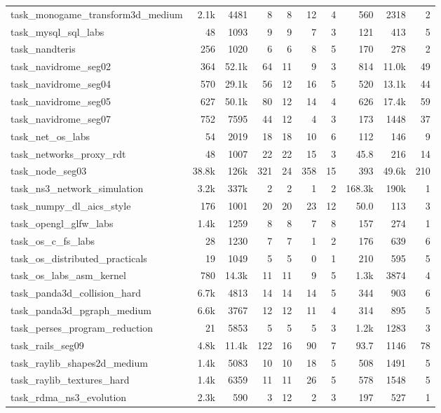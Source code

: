 \begin{table}[!htbp]
{\begin{tabular}{@{}lrr|r|rrr|rrr@{}}
task\_monogame\_transform3d\_medium & 2.1k & 4481 & 8 & 8 & 12 & 4 & 560 & 2318 & 2 \\
task\_mysql\_sql\_labs & 48 & 1093 & 9 & 9 & 7 & 3 & 121 & 413 & 5 \\
task\_nandteris & 256 & 1020 & 6 & 6 & 8 & 5 & 170 & 278 & 2 \\
task\_navidrome\_seg02 & 364 & 52.1k & 64 & 11 & 9 & 3 & 814 & 11.0k & 49 \\
task\_navidrome\_seg04 & 570 & 29.1k & 56 & 12 & 16 & 5 & 520 & 13.1k & 44 \\
task\_navidrome\_seg05 & 627 & 50.1k & 80 & 12 & 14 & 4 & 626 & 17.4k & 59 \\
task\_navidrome\_seg07 & 752 & 7595 & 44 & 12 & 4 & 3 & 173 & 1448 & 37 \\
task\_net\_os\_labs & 54 & 2019 & 18 & 18 & 10 & 6 & 112 & 146 & 9 \\
task\_networks\_proxy\_rdt & 48 & 1007 & 22 & 22 & 15 & 3 & 45.8 & 216 & 14 \\
task\_node\_seg03 & 38.8k & 126k & 321 & 24 & 358 & 15 & 393 & 49.6k & 210 \\
task\_ns3\_network\_simulation & 3.2k & 337k & 2 & 2 & 1 & 2 & 168.3k & 190k & 1 \\
task\_numpy\_dl\_aics\_style & 176 & 1001 & 20 & 20 & 23 & 12 & 50.0 & 113 & 3 \\
task\_opengl\_glfw\_labs & 1.4k & 1259 & 8 & 8 & 7 & 8 & 157 & 274 & 1 \\
task\_os\_c\_fs\_labs & 28 & 1230 & 7 & 7 & 1 & 2 & 176 & 639 & 6 \\
task\_os\_distributed\_practicals & 19 & 1049 & 5 & 5 & 0 & 1 & 210 & 595 & 5 \\
task\_os\_labs\_asm\_kernel & 780 & 14.3k & 11 & 11 & 9 & 5 & 1.3k & 3874 & 4 \\
task\_panda3d\_collision\_hard & 6.7k & 4813 & 14 & 14 & 14 & 5 & 344 & 903 & 6 \\
task\_panda3d\_pgraph\_medium & 6.6k & 3767 & 12 & 12 & 11 & 4 & 314 & 895 & 5 \\
task\_perses\_program\_reduction & 21 & 5853 & 5 & 5 & 5 & 3 & 1.2k & 1283 & 3 \\
task\_rails\_seg09 & 4.8k & 11.4k & 122 & 16 & 90 & 7 & 93.7 & 1146 & 78 \\
task\_raylib\_shapes2d\_medium & 1.4k & 5083 & 10 & 10 & 18 & 5 & 508 & 1491 & 5 \\
task\_raylib\_textures\_hard & 1.4k & 6359 & 11 & 11 & 26 & 5 & 578 & 1548 & 5 \\
task\_rdma\_ns3\_evolution & 2.3k & 590 & 3 & 12 & 2 & 3 & 197 & 527 & 1 \\

\end{tabular}}
\end{table}
